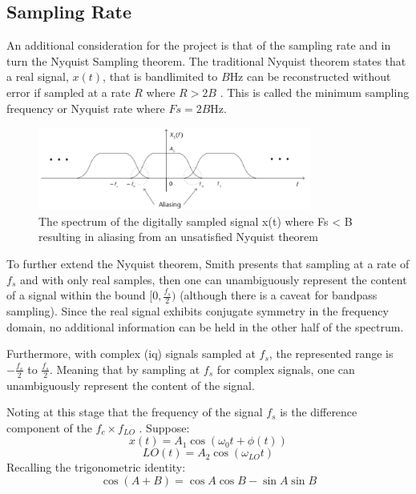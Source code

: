 \documentclass[class=report,11pt,crop=false]{standalone}
\begin{document}
\subsection{Sampling Rate}
An additional consideration for the project is that of the sampling rate and in turn the Nyquist Sampling theorem. The traditional Nyquist theorem states  that a real signal, $x(t)$, that is bandlimited to $B$Hz can be reconstructed without error if sampled at a rate $R$ where $R > 2B$ \cite{sdr-for-engineers}. This is called the minimum sampling frequency or Nyquist rate where $Fs = 2B$Hz.
\begin{figure}[h]
    \centering
    \includegraphics[width=0.8\textwidth]{Images/diagrams/aliasing.png}
    \caption{The spectrum of the digitally sampled signal x(t) where Fs < B resulting in aliasing from an unsatisfied Nyquist theorem \cite{sdr-for-engineers}}
    \label{fig:aliasing}
\end{figure}
    
To further extend the Nyquist theorem, Smith \cite{engineers-dsp} presents that sampling at a rate of $f_s$ and with only real samples, then one can unambiguously represent the content of a signal within the bound $[0, \frac{f_s}{2}) $  (although there is a caveat for bandpass sampling). Since the real signal exhibits conjugate symmetry in the frequency domain, no additional information can be held in the other half of the spectrum. 

Furthermore, with complex (\gls{iq}) signals sampled at $f_s$, the represented range is $-\frac{f_s}{2}$ to $\frac{f_s}{2}$. Meaning that by sampling at $f_s$ for complex signals, one can unambiguously represent the content of the signal. 

Noting at this stage that the frequency of the signal $f_s$ is the difference component of the $f_c \times f_{LO} $ \cite{superhet}. Suppose:
\begin{equation*}
    x(t) = A_1 \cos{(\omega_0 t + \phi(t))} 
\end{equation*}
\begin{equation*}
    LO(t) = A_2 \cos{(\omega_{LO} t)} 
\end{equation*}
Recalling the trigonometric identity:
\begin{equation}
    \cos(A + B) = \cos A \cos B - \sin A\sin B
\end{equation}
\end{document}
